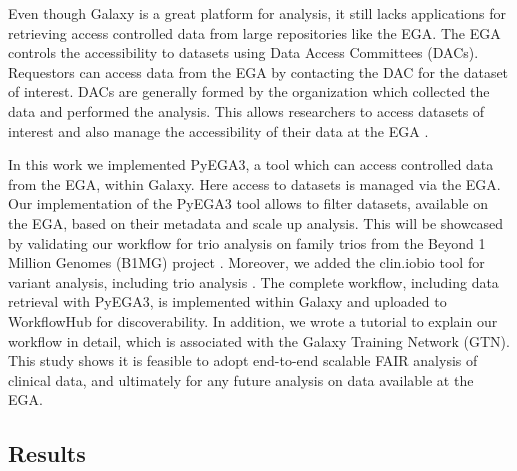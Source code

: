 Even though Galaxy is a great platform for analysis, it still lacks applications for retrieving access controlled data from large repositories like the EGA. The EGA controls the accessibility to datasets using Data Access Committees (DACs). Requestors can access data from the EGA by contacting the DAC for the dataset of interest. DACs are generally formed by the organization which collected the data and performed the analysis. This allows researchers to access datasets of interest and also manage the accessibility of their data at the EGA \cite{DAC}.

In this work we implemented PyEGA3, a tool which can access controlled data from the EGA, within Galaxy. Here access to datasets is managed via the EGA. Our implementation of the PyEGA3 tool allows to filter datasets, available on the EGA, based on their metadata and scale up analysis. This will be showcased by validating our workflow for trio analysis on family trios from the Beyond 1 Million Genomes (B1MG) project \cite{B1MG}. Moreover, we added the clin.iobio tool for variant analysis, including trio analysis \cite{cliniobio}. The complete workflow, including data retrieval with PyEGA3, is implemented within Galaxy and uploaded to WorkflowHub for discoverability. In addition, we wrote a tutorial to explain our workflow in detail, which is associated with the Galaxy Training Network (GTN). This study shows it is feasible to adopt end-to-end scalable FAIR analysis of clinical data, and ultimately for any future analysis on data available at the EGA. 

\subsection*{Results}


